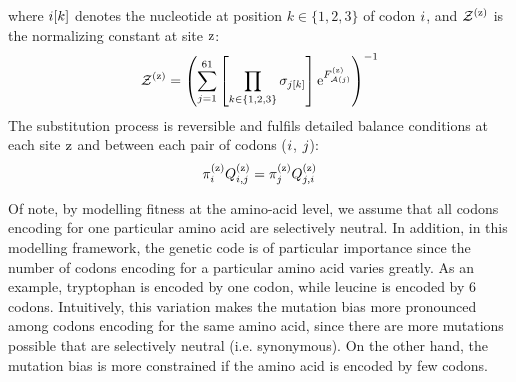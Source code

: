 \documentclass{article}
\begin{document}
where ${i}[k]$ denotes the nucleotide at position $k \in \{ 1, 2, 3 \}$ of codon ${i}$, and $\mathcal{Z}^{(\text{z})} $ is the normalizing constant at site $\text{z}$:
\begin{align}
    \mathcal{Z}^{(\text{z})} = \left( \sum\limits_{{j}=1}^{61} \left[\prod\limits_{k \in \{ 1, 2, 3 \}} \sigma_{{j}[k]}\right] \text{e}^{F_{\mathcal{A}({j})}^{(\text{z})}} \right)^{-1}
\end{align}
The {substitution} process is reversible and fulfils detailed balance conditions at each site $\text{z}$ and between each pair of codons (${i}$, ${j}$):
\begin{align}
    \pi_{{i}}^{(\text{z})} Q_{{i}, {j}}^{(\text{z})} = \pi_{{j}}^{(\text{z})} Q_{{j}, {i}}^{(\text{z})}
    \label{codonSubBalance}
\end{align}

Of note, by modelling fitness at the amino-acid level, we assume that all codons encoding for one particular amino acid are selectively {neutral}.
In addition, in this modelling framework, the genetic code is of particular importance since the number of codons encoding for a particular amino acid varies greatly.
As an example, tryptophan is encoded by one codon, while leucine is encoded by 6 codons.
Intuitively, this variation makes the mutation bias more pronounced among codons encoding for the same amino acid, since there are more mutations possible that are selectively {neutral} (i.e. synonymous).
On the other hand, the mutation bias is more constrained if the amino acid is encoded by few codons.
\end{document}
